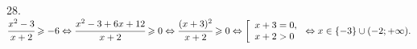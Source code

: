 28. $\cfrac{x^2-3}{x+2}\geqslant-6\Leftrightarrow \cfrac{x^2-3+6x+12}{x+2}\geqslant0\Leftrightarrow \cfrac{(x+3)^2}{x+2}\geqslant0
\Leftrightarrow
\left[\begin{array}{l}
x+3=0,\\
x+2>0
\end{array}\right.\Leftrightarrow x \in \{-3\}\cup(-2;+\infty).$\\
